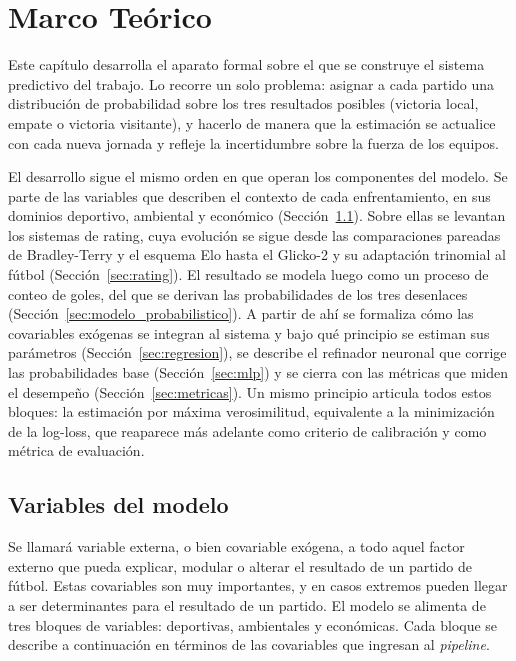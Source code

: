 \chapter{Marco Te\'orico}
\label{ch:marco}

Este cap\'itulo desarrolla el aparato formal sobre el que se construye el sistema predictivo del trabajo. Lo recorre un solo problema: asignar a cada partido una distribuci\'on de probabilidad sobre los tres resultados posibles (victoria local, empate o victoria visitante), y hacerlo de manera que la estimaci\'on se actualice con cada nueva jornada y refleje la incertidumbre sobre la fuerza de los equipos.

El desarrollo sigue el mismo orden en que operan los componentes del modelo. Se parte de las variables que describen el contexto de cada enfrentamiento, en sus dominios deportivo, ambiental y econ\'omico (Secci\'on~\ref{sec:variables}). Sobre ellas se levantan los sistemas de rating, cuya evoluci\'on se sigue desde las comparaciones pareadas de Bradley-Terry y el esquema Elo hasta el Glicko-2 y su adaptaci\'on trinomial al f\'utbol (Secci\'on~\ref{sec:rating}). El resultado se modela luego como un proceso de conteo de goles, del que se derivan las probabilidades de los tres desenlaces (Secci\'on~\ref{sec:modelo_probabilistico}). A partir de ah\'i se formaliza c\'omo las covariables ex\'ogenas se integran al sistema y bajo qu\'e principio se estiman sus par\'ametros (Secci\'on~\ref{sec:regresion}), se describe el refinador neuronal que corrige las probabilidades base (Secci\'on~\ref{sec:mlp}) y se cierra con las m\'etricas que miden el desempe\~no (Secci\'on~\ref{sec:metricas}). Un mismo principio articula todos estos bloques: la estimaci\'on por m\'axima verosimilitud, equivalente a la minimizaci\'on de la log-loss, que reaparece m\'as adelante como criterio de calibraci\'on y como m\'etrica de evaluaci\'on.

\section{Variables del modelo}
\label{sec:variables}

Se llamar\'a variable externa, o bien covariable ex\'ogena, a todo aquel factor externo que pueda explicar, modular o alterar el resultado de un partido de f\'utbol. Estas covariables son muy importantes, y en casos extremos pueden llegar a ser determinantes para el resultado de un partido. El modelo se alimenta de tres bloques de variables: deportivas, ambientales y econ\'omicas. Cada bloque se describe a continuaci\'on en t\'erminos de las covariables que ingresan al \textit{pipeline}.

